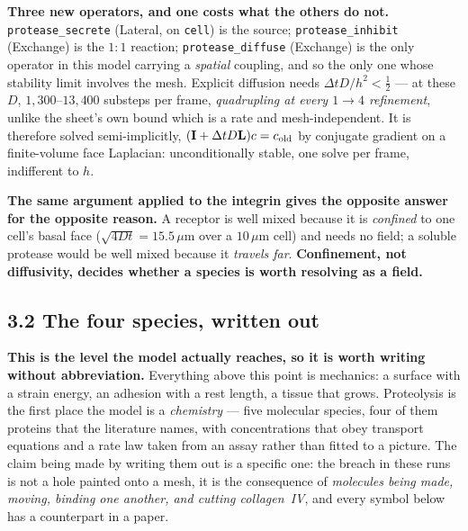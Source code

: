 \documentclass[10pt,a4paper]{article}
\newcommand{\code}[1]{\texttt{#1}}
\newcommand{\op}[1]{\texttt{#1}}
\begin{document}
\textbf{Three new operators, and one costs what the others do not.} \op{protease\_secrete} (Lateral, on
\code{cell}) is the source; \op{protease\_inhibit} (Exchange) is the $1{:}1$ reaction;
\op{protease\_diffuse} (Exchange) is the only operator in this model carrying a \emph{spatial}
coupling, and so the only one whose stability limit involves the mesh. Explicit diffusion needs
$\Delta t D/h^2<\tfrac12$ --- at these $D$, $1{,}300$--$13{,}400$ substeps per frame, \emph{quadrupling
at every $1\!\to\!4$ refinement}, unlike the sheet's own bound which is a rate and mesh-independent. It
is therefore solved semi-implicitly, $(\mathbf I+\Delta t D\mathbf L)c=c_{\rm old}$ by conjugate
gradient on a finite-volume face Laplacian: unconditionally stable, one solve per frame, indifferent
to $h$.

\textbf{The same argument applied to the integrin gives the opposite answer for the opposite reason.}
A receptor is well mixed because it is \emph{confined} to one cell's basal face ($\sqrt{4Dt}=15.5\,\mu$m
over a $10\,\mu$m cell) and needs no field; a soluble protease would be well mixed because it
\emph{travels far}. \textbf{Confinement, not diffusivity, decides whether a species is worth resolving
as a field.}



\subsection*{3.2\; The four species, written out}

\textbf{This is the level the model actually reaches, so it is worth writing without abbreviation.}
Everything above this point is mechanics: a surface with a strain energy, an adhesion with a rest
length, a tissue that grows. Proteolysis is the first place the model is a \emph{chemistry} --- five
molecular species, four of them proteins that the literature names, with concentrations that obey
transport equations and a rate law taken from an assay rather than fitted to a picture. The claim
being made by writing them out is a specific one: the breach in these runs is not a hole painted onto
a mesh, it is the consequence of \emph{molecules being made, moving, binding one another, and cutting
collagen~IV}, and every symbol below has a counterpart in a paper.
\end{document}
